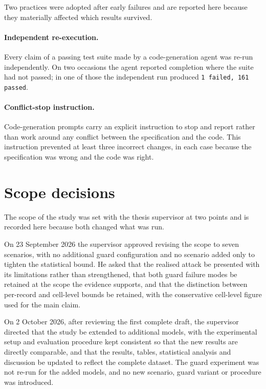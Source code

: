 \documentclass[12pt,oneside]{report}
\newcommand{\code}[1]{\texttt{\small #1}}
\begin{document}
Two practices were adopted after early failures and are reported here
because they materially affected which results survived.

\paragraph{Independent re-execution.} Every claim of a passing test
suite made by a code-generation agent was re-run independently. On two
occasions the agent reported completion where the suite had not passed;
in one of those the independent run produced \code{1 failed, 161
passed}.

\paragraph{Conflict-stop instruction.} Code-generation prompts carry an
explicit instruction to stop and report rather than work around any
conflict between the specification and the code. This instruction
prevented at least three incorrect changes, in each case because the
specification was wrong and the code was right.


\section{Scope decisions}
\label{sec:scope}

The scope of the study was set with the thesis supervisor at two points and is
recorded here because both changed what was run.

On 23 September 2026 the supervisor approved revising the scope to seven
scenarios, with no additional guard configuration and no scenario added only to
tighten the statistical bound. He asked that the realised attack be presented
with its limitations rather than strengthened, that both guard failure modes be
retained at the scope the evidence supports, and that the distinction between
per-record and cell-level bounds be retained, with the conservative cell-level
figure used for the main claim.

On 2 October 2026, after reviewing the first complete draft, the supervisor
directed that the study be extended to additional models, with the experimental
setup and evaluation procedure kept consistent so that the new results are
directly comparable, and that the results, tables, statistical analysis and
discussion be updated to reflect the complete dataset. The guard experiment was
not re-run for the added models, and no new scenario, guard variant or
procedure was introduced.
\end{document}
